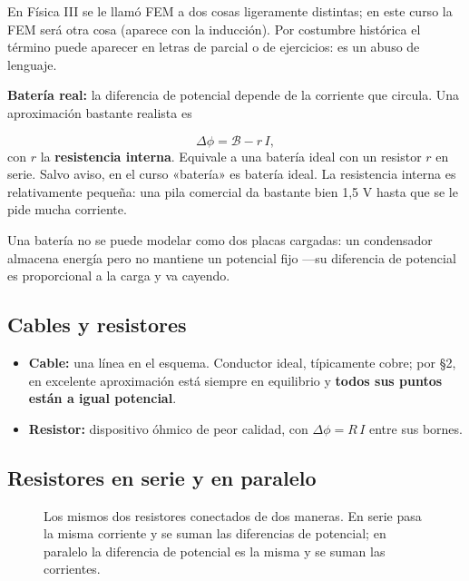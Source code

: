 \documentclass[12pt,a4paper]{article}
\begin{document}
\begin{warnbox}
En Física III se le llamó FEM a dos cosas
ligeramente distintas; en este curso la FEM será otra cosa (aparece con la
inducción). Por costumbre histórica el término puede aparecer en letras de
parcial o de ejercicios: es un abuso de lenguaje.
\end{warnbox}

\textbf{Batería real:} la diferencia de potencial depende de la corriente que
circula. Una aproximación bastante realista es

\[
\Delta\phi = \mathcal{B} - r\,I,
\]
con $r$ la \textbf{resistencia interna}. Equivale a una batería ideal con un
resistor $r$ en serie. Salvo aviso, en el curso «batería» es batería ideal. La
resistencia interna es relativamente pequeña: una pila comercial da bastante
bien 1,5 V hasta que se le pide mucha corriente.

\begin{notebox}
Una batería no se puede modelar como dos placas cargadas: un condensador
almacena energía pero no mantiene un potencial fijo ---su diferencia de
potencial es proporcional a la carga y va cayendo.
\end{notebox}

\subsection{Cables y resistores}

\begin{itemize}
  \item \textbf{Cable:} una línea en el esquema. Conductor ideal, típicamente cobre; por
  §2, en excelente aproximación está siempre en equilibrio y \textbf{todos sus puntos
  están a igual potencial}.
  \item \textbf{Resistor:} dispositivo óhmico de peor calidad, con $\Delta\phi = R\,I$
  entre sus bornes.
\end{itemize}

\subsection{Resistores en serie y en paralelo}

\begin{figure}[H]
  \centering
  
  \caption{Los mismos dos resistores conectados de dos maneras. En serie pasa la misma corriente y se suman las diferencias de potencial; en paralelo la diferencia de potencial es la misma y se suman las corrientes.}
\end{figure}
\end{document}
